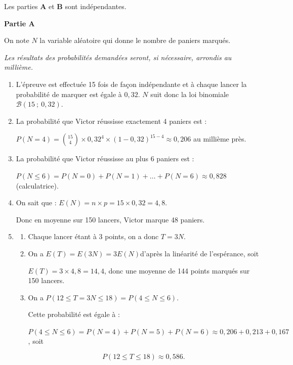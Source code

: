 \medskip



Les parties \textbf{A} et \textbf{B} sont indépendantes.

\bigskip

\textbf{Partie A}

\medskip






On note $N$ la variable aléatoire qui donne le nombre de paniers marqués.

\medskip

\emph{Les résultats des probabilités demandées seront, si nécessaire, arrondis au millième.}

\begin{enumerate}
\item 
L'épreuve est effectuée 15 fois de façon indépendante et à chaque lancer la probabilité de marquer est égale à $0,32$. $N$ suit donc la loi binomiale $\mathcal{B}(15~;~0,32)$.
\item 
La probabilité que Victor réussisse exactement 4 paniers est :

$P(N = 4) = \displaystyle \binom{15}{4}\times 0,32^4 \times (1 - 0,32)^{15-4} \approx 0,206$ au millième près.
\item 
La probabilité que Victor réussisse au plus 6 paniers est :

$P(N \leqslant 6) = P(N=0) + P(N = 1) + \ldots + P(N = 6) \approx 0,828$ (calculatrice).
\item 
On sait que : $E(N) = n \times p = 15 \times 0,32 = 4,8$.

Donc en moyenne sur 150 lancers, Victor marque 48 paniers.
\item 
	\begin{enumerate}
		\item 
Chaque lancer étant à 3 points, on a donc $T = 3N$.
		\item 
On a $E(T) = E (3N) = 3E(N)$\quad d'après la linéarité de l'espérance, soit

$E(T) = 3 \times 4,8 = 14,4$, donc une moyenne de 144 points marqués sur 150 lancers.
		\item 
On a $P(12 \leqslant T = 3N \leqslant 18) = P(4 \leqslant N \leqslant 6)$.

Cette probabilité est égale à :

$P(4 \leqslant N \leqslant 6) = P(N=4) + P(N=5) + P(N = 6) \approx 0,206 + 0,213 + 0,167$, soit

\[P(12 \leqslant T \leqslant 18) \approx 0,586.\]
	\end{enumerate}
\end{enumerate}


